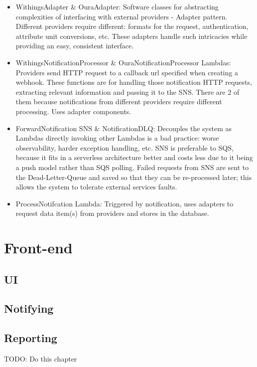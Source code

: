 \begin{itemize}
    \item {WithingsAdapter \& OuraAdapter: Software classes for abstracting complexities of interfacing with external providers - Adapter pattern. Different providers require different: formats for the request, authentication, attribute unit conversions, etc. These adapters handle such intricacies while providing an easy, consistent interface.}
    \item {WithingsNotificationProcessor \& OuraNotificationProcessor Lambdas: Providers send HTTP request to a callback url specified when creating a webhook. These functions are for handling those notification HTTP requests, extracting relevant information and passing it to the SNS. There are 2 of them because notifications from different providers require different processing. Uses adapter components.}
    \item {ForwardNotification SNS \& NotificationDLQ: Decouples the system as Lambdas directly invoking other Lambdas is a bad practice: worse observability, harder exception handling, etc. SNS is preferable to SQS, because it fits in a serverless architecture better and costs less due to it being a push model rather than SQS polling. Failed requests from SNS are sent to the Dead-Letter-Queue and saved so that they can be re-processed later; this allows the system to tolerate external services faults.}
    \item {ProcessNotifcation Lambda: Triggered by notification, uses adapters to request data item(s) from providers and stores in the database.}
\end{itemize}

\section{Front-end}
\subsection{UI}
\subsection{Notifying}
\subsection{Reporting}

TODO: Do this chapter
